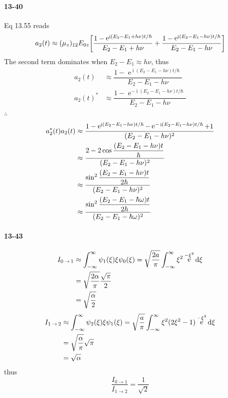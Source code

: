 \documentclass[a4paper]{article}
\DeclareMathOperator{\intdinf}{\int_{-\infty}^\infty}
\DeclareMathOperator{\e}{\mathrm{e}}
\DeclareMathOperator{\I}{\mathrm{i}}
\DeclareMathOperator{\ra}{\rightarrow}
\newcommand{\ex}[1]{\paragraph{13-#1}}
\numberwithin{equation}{section}
\begin{document}
\ex{40}
Eq 13.55 reads
\begin{equation}\label{key}
a_2(t) \approx (\mu_z)_{12}E_{0z}\qty[\dfrac{1 - \e^{\I(E_2-E_1+h\nu)t/\hbar}}{E_2 - E_1 + h\nu} + \dfrac{1 - \e^{\I(E_2-E_1-h\nu)t/\hbar}}{E_2 - E_1 - h\nu}]
\end{equation}
The second term dominates when $ E_2 - E_1 \approx h\nu $, thus
\begin{align}
a_2(t) &\approx \dfrac{1 - \e^{\I(E_2-E_1-h\nu)t/\hbar}}{E_2 - E_1 - h\nu}\\
a_2(t)^* &\approx \dfrac{1 - \e^{-\I(E_2-E_1-h\nu)t/\hbar}}{E_2 - E_1 - h\nu}
\end{align}
$ \therefore $
\begin{align}
a_2^*(t)a_2(t) &\approx \dfrac{1 - \e^{\I(E_2-E_1-h\nu)t/\hbar} - \e^{-\I(E_2-E_1-h\nu)t/\hbar} + 1}{(E_2 - E_1 - h\nu)^2}\notag\\
&\approx \dfrac{2 - 2\cos\dfrac{(E_2-E_1-h\nu)t}{\hbar}}{(E_2 - E_1 - h\nu)^2}\notag\\
&\approx \dfrac{\sin^2\dfrac{(E_2-E_1-h\nu)t}{2\hbar}}{(E_2 - E_1 - h\nu)^2} \notag\\
&\approx \dfrac{\sin^2\dfrac{(E_2-E_1-\hbar\omega)t}{2\hbar}}{(E_2 - E_1 - \hbar\omega)^2} 
\end{align}

\ex{43}
\begin{align}
I_{0\ra 1} &\approx \intdinf \psi_1(\xi)\xi\psi_0(\xi) = \sqrt{\dfrac{2a}{\pi}}\intdinf \xi^2 \e^{-\xi^2}\dd\xi \notag\\
&= \sqrt{\dfrac{2\alpha}{\pi}} \dfrac{\sqrt{\pi}}{2} \notag\\
&= \sqrt{\dfrac{\alpha}{2}} 
\end{align}
\begin{align}
I_{1\ra 2} &\approx \intdinf \psi_2(\xi)\xi\psi_1(\xi) = \sqrt{\dfrac{a}{\pi}}\intdinf \xi^2(2\xi^2 - 1) \e^{-\xi^2}\dd\xi \notag\\
&= \sqrt{\dfrac{\alpha}{\pi}} \sqrt{\pi} \notag\\
&= \sqrt{\alpha}
\end{align}
thus
\begin{equation}\label{key}
\dfrac{I_{0\ra 1}}{I_{1\ra 2}} = \dfrac{1}{\sqrt{2}}
\end{equation}
\end{document}

